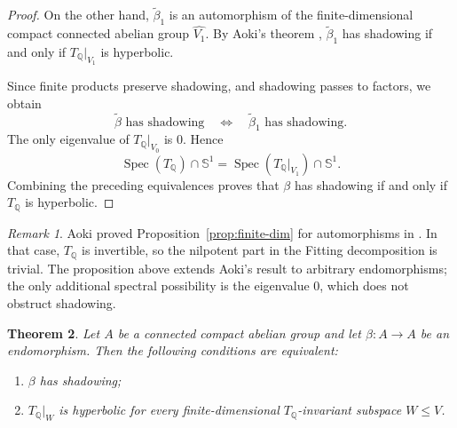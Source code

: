 \documentclass[12pt]{amsart}
\newtheorem{theorem}{Theorem}[section]
\theoremstyle{definition}
\numberwithin{equation}{section}
\theoremstyle{remark}
\newtheorem{remark}[theorem]{Remark}
\begin{document}
\begin{proof}
On the other hand, $\widetilde\beta_1$ is an automorphism of the
finite-dimensional compact connected abelian group
$\widehat{V_1}$. By Aoki's theorem \cite[Theorem 2]{AokiSolenoid},
$\widetilde\beta_1$ has shadowing if and only if
$T_{\mathbb Q}|_{V_1}$ is hyperbolic.

Since finite products preserve shadowing, and shadowing passes to
factors, we obtain
\[
\widetilde\beta\text{ has shadowing}
\quad\Longleftrightarrow\quad
\widetilde\beta_1\text{ has shadowing}.
\]
The only eigenvalue of $T_{\mathbb Q}|_{V_0}$ is $0$. Hence
\[
\operatorname{Spec}(T_{\mathbb Q})\cap\mathbb S^1
=
\operatorname{Spec}(T_{\mathbb Q}|_{V_1})\cap\mathbb S^1.
\]
Combining the preceding equivalences proves that $\beta$ has
shadowing if and only if $T_{\mathbb Q}$ is hyperbolic.
\end{proof}

\begin{remark}
Aoki proved Proposition~\ref{prop:finite-dim} for
automorphisms in \cite[Theorem~2]{AokiSolenoid}. In that case,
$T_{\mathbb Q}$ is invertible, so the nilpotent part in the Fitting
decomposition is trivial. The proposition above extends Aoki's result
to arbitrary endomorphisms; the only additional spectral possibility
is the eigenvalue $0$, which does not obstruct shadowing.
\end{remark}





\begin{theorem}\label{thm:abelian-endo-shad}
Let $A$ be a connected compact abelian group and let
$\beta:A\to A$ be an endomorphism. Then the following conditions are
equivalent:
\begin{enumerate}
\item $\beta$ has shadowing;
\item $T_{\mathbb Q}|_W$ is hyperbolic for every finite-dimensional
$T_{\mathbb Q}$-invariant subspace $W\leq V$.
\end{enumerate}
\end{theorem}
\end{document}
